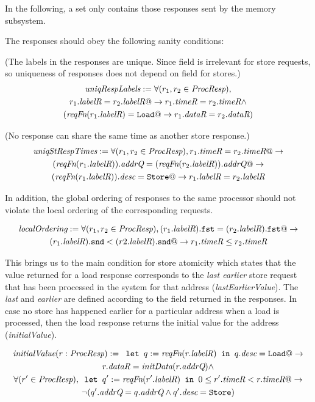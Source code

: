 In the following, a \Response set only contains those responses sent by the
memory subsystem.

The responses should obey the following sanity conditions:

\begin{defn} (The labels in the responses are unique. Since \dataR{} field is
irrelevant for store requests, so uniqueness of responses does not depend on
\dataR{} field for stores.)
\begin{multline*}
\textit{uniqRespLabels} := \forall (r_1, r_2 \in \textit{ProcResp}),\\
r_1.\textit{labelR} = r_2.\textit{labelR} @-> r_1.\textit{timeR} = r_2.\textit{timeR} \wedge\\
(\textit{reqFn}(r_1.\textit{labelR}) = \texttt{Load} @-> r_1.\textit{dataR} = r_2.\textit{dataR})
\end{multline*}
\end{defn}

\begin{defn} (No response can share the same time as another store response.)
\begin{multline*}
\textit{uniqStRespTimes} := 
\forall (r_1, r_2 \in \textit{ProcResp}),
r_1.\textit{timeR} = r_2.\textit{timeR} @-> \\
(\textit{reqFn} (r_1.\textit{labelR})).\textit{addrQ} = (\textit{reqFn} (r_2.\textit{labelR})).\textit{addrQ} @->\\
(\textit{reqFn} (r_1.\textit{labelR})).\textit{desc} = \texttt{Store} @->
r_1.\textit{labelR} = r_2.\textit{labelR}
\end{multline*}
\end{defn}

In addition, the global ordering of responses to the same processor should not
violate the local ordering of the corresponding requests.
\begin{defn}
\begin{multline*}
\textit{localOrdering} :=
\forall (r_1, r_2 \in \textit{ProcResp}), (r_1.\textit{labelR}).\texttt{fst} = (r_2.\textit{labelR}).\texttt{fst} @->\\
(r_1.\textit{labelR}).\texttt{snd} < (r2.\textit{labelR}).\texttt{snd} @-> r_1.\textit{timeR} \le r_2.\textit{timeR}
\end{multline*}
\end{defn}

This brings us to the main condition for store atomicity which states that the
value returned for a load response corresponds to the \emph{last earlier} store
request that has been processed in the system for that address
(\textit{lastEarlierValue}). The \emph{last} and \emph{earlier} are defined
according to the field \timeR{} returned in the responses. In case no store has
happened earlier for a particular address when a load is processed, then the
load response returns the initial value for the address (\textit{initialValue}).
\begin{defn}
\begin{multline*}
\textit{initialValue} (r: \textit{ProcResp}) := \texttt{ let } q := \textit{reqFn} (r.\textit{labelR}) \texttt{ in }
q.\textit{desc} = \texttt{Load} @-> \\ r.\textit{dataR} = \textit{initData} (r.\textit{addrQ}) \wedge \\
\forall (r' \in \textit{ProcResp}), \texttt{ let } q' := \textit{reqFn} (r'.\textit{labelR}) \texttt{ in } 0 \le r'.\textit{timeR} < r.\textit{timeR} @->\\
\neg (q'.\textit{addrQ} = q.\textit{addrQ} \wedge q'.\textit{desc} = \texttt{Store})
\end{multline*}
\end{defn}

